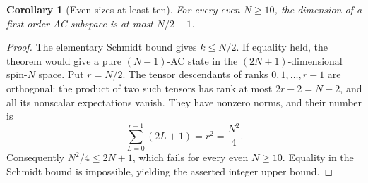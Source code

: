 \documentclass[11pt]{article}
\newtheorem{corollary}{Corollary}
\begin{document}
\begin{corollary}[Even sizes at least ten]
For every even $N\ge10$, the dimension of a first-order AC subspace is at most $N/2-1$.
\end{corollary}
\begin{proof}
The elementary Schmidt bound gives $k\le N/2$. If equality held, the theorem would give a pure $(N-1)$-AC state in the $(2N+1)$-dimensional spin-$N$ space. Put $r=N/2$. The tensor descendants of ranks $0,1,\ldots,r-1$ are orthogonal: the product of two such tensors has rank at most $2r-2=N-2$, and all its nonscalar expectations vanish. They have nonzero norms, and their number is
\[
 \sum_{L=0}^{r-1}(2L+1)=r^2=\frac{N^2}{4}.
\]
Consequently $N^2/4\le2N+1$, which fails for every even $N\ge10$. Equality in the Schmidt bound is impossible, yielding the asserted integer upper bound.
\end{proof}
\end{document}
